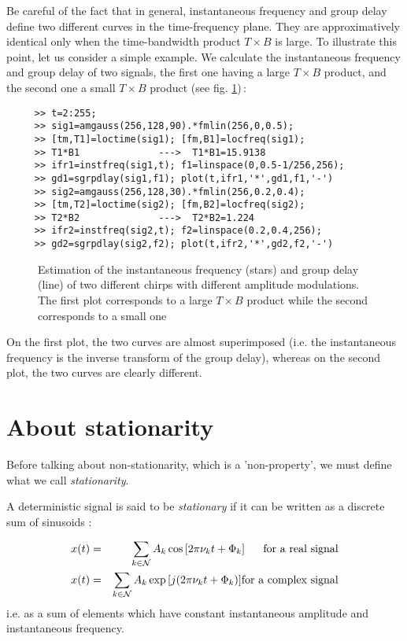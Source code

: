 Be careful of the fact that in general, instantaneous frequency and group
delay define two different curves in the time-frequency plane. They are
approximatively identical only when the time-bandwidth product $T\times B$
is large. To illustrate this point, let us consider a simple example. We
calculate the instantaneous frequency and group delay of two signals, the
first one having a large $T\times B$ product, and the second one a small
$T\times B$ product (see fig. \ref{Ns4fig2})\,:
\begin{verbatim}
     >> t=2:255; 
     >> sig1=amgauss(256,128,90).*fmlin(256,0,0.5);
     >> [tm,T1]=loctime(sig1); [fm,B1]=locfreq(sig1); 
     >> T1*B1              --->  T1*B1=15.9138
     >> ifr1=instfreq(sig1,t); f1=linspace(0,0.5-1/256,256);
     >> gd1=sgrpdlay(sig1,f1); plot(t,ifr1,'*',gd1,f1,'-')
     >> sig2=amgauss(256,128,30).*fmlin(256,0.2,0.4);
     >> [tm,T2]=loctime(sig2); [fm,B2]=locfreq(sig2); 
     >> T2*B2              --->  T2*B2=1.224
     >> ifr2=instfreq(sig2,t); f2=linspace(0.2,0.4,256);
     >> gd2=sgrpdlay(sig2,f2); plot(t,ifr2,'*',gd2,f2,'-')
\end{verbatim}
\begin{figure}[htb]
\epsfxsize=10cm
\epsfysize=8cm
\centerline{}
\caption{\label{Ns4fig2}Estimation of the instantaneous frequency (stars)
and group delay (line) of two different chirps with different amplitude
modulations. The first plot corresponds to a large $T\times B$ product
while the second corresponds to a small one}
\end{figure}
On the first plot, the two curves are almost superimposed (i.e. the
instantaneous frequency is the inverse transform of the group delay),
whereas on the second plot, the two curves are clearly different.


\section{About stationarity}
  Before talking about non-stationarity, which is a 'non-property', we must
define what we call {\it stationarity}.

  A deterministic signal is said to be {\it stationary} if it can be
written as a discrete sum of sinusoids :

\begin{eqnarray*}
x(t)&=&\sum_{k \in \Nset} A_k \cos{[2\pi \nu_k t + \Phi_k]} \ \ \ \
\mbox{ for a real signal} \\   
x(t)&=&\sum_{k \in \Nset} A_k \exp{[j(2\pi \nu_k t + \Phi_k)]} 
\mbox{for a complex signal}  
\end{eqnarray*}
i.e. as a sum of elements which have constant instantaneous amplitude and
instantaneous frequency.

